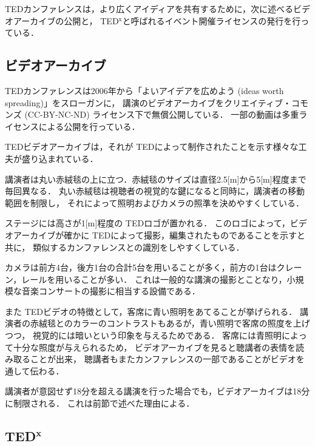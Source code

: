 \documentclass[submit,techreq,jkeyword,noauthor]{ipsj}
\newcommand{\TED}{\textrm{TED}}
\newcommand{\TEDx}{\TED${}^{\textrm{x}}$}
\newcommand{\TEDtitle}{\textbf{TED}}
\newcommand{\TEDxtitle}{\TEDtitle${}^{\textbf{x}}$}
\begin{document}

\TED カンファレンスは，より広くアイディアを共有するために，次に述べるビデオアーカイブの公開と，
\TEDx と呼ばれるイベント開催ライセンスの発行を行っている．

\subsection{ビデオアーカイブ}

\TED カンファレンスは2006年から「よいアイデアを広めよう (ideas worth spreading)」をスローガンに，
講演のビデオアーカイブをクリエイティブ・コモンズ (CC-BY-NC-ND) ライセンス下で無償公開している．
一部の動画は多重ライセンスによる公開を行っている．

\TED ビデオアーカイブは，それが \TED によって制作されたことを示す様々な工夫が盛り込まれている．

講演者は丸い赤絨毯の上に立つ．赤絨毯のサイズは直径2.5[m]から5[m]程度まで毎回異なる．
丸い赤絨毯は視聴者の視覚的な鍵になると同時に，講演者の移動範囲を制限し，
それによって照明およびカメラの照準を決めやすくしている．

ステージには高さが1[m]程度の \TED ロゴが置かれる．
このロゴによって，ビデオアーカイブが確かに \TED によって撮影，編集されたものであることを示すと共に，
類似するカンファレンスとの識別をしやすくしている．

カメラは前方4台，後方1台の合計5台を用いることが多く，前方の1台はクレーン，レールを用いることが多い．
これは一般的な講演の撮影とことなり，小規模な音楽コンサートの撮影に相当する設備である．

また \TED ビデオの特徴として，客席に青い照明をあてることが挙げられる．
講演者の赤絨毯とのカラーのコントラストもあるが，青い照明で客席の照度を上げつつ，
視覚的には暗いという印象を与えるためである．
客席には青照明によって十分な照度が与えられるため，
ビデオアーカイブを見ると聴講者の表情を読み取ることが出来，
聴講者もまたカンファレンスの一部であることがビデオを通して伝わる．

講演者が意図せず18分を超える講演を行った場合でも，ビデオアーカイブは18分に制限される．
これは前節で述べた理由による．


\subsection{\TEDxtitle}
\end{document}
